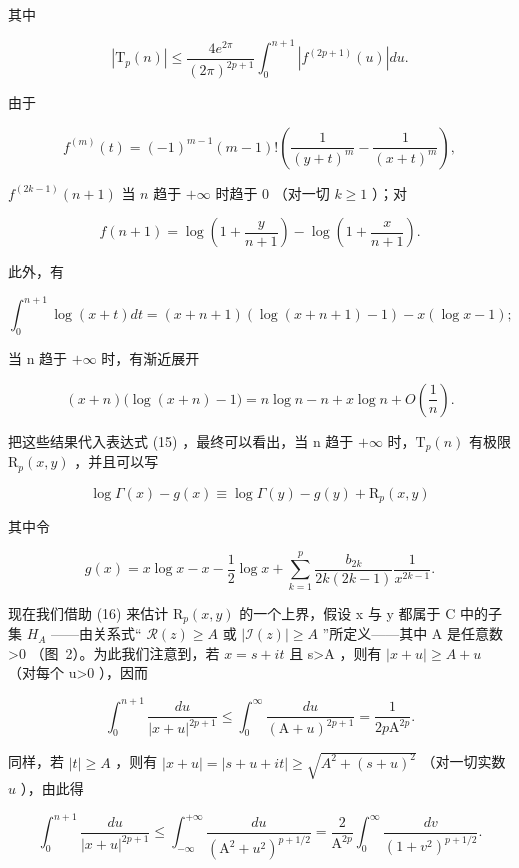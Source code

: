 其中

\[
\left| \mathrm{T} _ {p} (n) \right| \leqslant \frac {4 e ^ {2 \pi}}{(2 \pi) ^ {2 p + 1}} \int_ {0} ^ {n + 1} \left| f ^ {(2 p + 1)} (u) \right| d u.\tag{16}
\]

由于

\[
f ^ {(m)} (t) = (- 1) ^ {m - 1} (m - 1)! \left(\frac {1}{(y + t) ^ {m}} - \frac {1}{(x + t) ^ {m}}\right),
\]

\(f^{(2k - 1)}(n + 1)\) 当 \(n\) 趋于 \(+\infty\) 时趋于 0 （对一切 \(k \geqslant 1\) ）；对

\[
f (n + 1) = \log \left(1 + \frac {y}{n + 1}\right) - \log \left(1 + \frac {x}{n + 1}\right).
\]

此外，有

\[
\int_ {0} ^ {n + 1} \log (x + t) d t = (x + n + 1) (\log (x + n + 1) - 1) - x (\log x - 1);
\]

当 n 趋于 \(+\infty\) 时，有渐近展开

\[
(x + n) \bigl (\log (x + n) - 1 \bigr) = n \log n - n + x \log n + O \left(\frac {1}{n}\right).
\]

把这些结果代入表达式 (15) ，最终可以看出，当 n 趋于 \(+\infty\) 时，\(\mathrm{T}_{p}(n)\) 有极限 \(\mathrm{R}_{p}(x, y)\) ，并且可以写

\[
\log \Gamma (x) - g (x) \equiv \log \Gamma (y) - g (y) + \mathrm{R} _ {p} (x, y)\tag{mod.  \( 2\pi i \)}
\]

其中令

\[
g (x) = x \log x - x - \frac {1}{2} \log x + \sum_ {k = 1} ^ {p} \frac {b _ {2 k}}{2 k (2 k - 1)} \frac {1}{x ^ {2 k - 1}}.\tag{17}
\]

现在我们借助 (16) 来估计 \(\mathrm{R}_{p}(x,y)\) 的一个上界，假设 x 与 y 都属于 C 中的子集 \(H_{A}\) ——由关系式`` \(\mathcal{R}(z)\geqslant A\) 或 \(|\mathcal{I}(z)|\geqslant A\) ''所定义——其中 A 是任意数 \textgreater0 （图~2）。为此我们注意到，若 \(x=s+it\) 且 s\textgreater A ，则有 \(|x+u|\geqslant A+u\) （对每个 u\textgreater0 ），因而

\[
\int_ {0} ^ {n + 1} \frac {d u}{| x + u | ^ {2 p + 1}} \leqslant \int_ {0} ^ {\infty} \frac {d u}{(\mathrm{A} + u) ^ {2 p + 1}} = \frac {1}{2 p \mathrm{A} ^ {2 p}}.
\]

同样，若 \(|t| \geqslant A\) ，则有 \(|x + u| = |s + u + it| \geqslant \sqrt{A^2 + (s + u)^2}\) （对一切实数 \(u\) ），由此得

\[
\int_ {0} ^ {n + 1} \frac {d u}{| x + u | ^ {2 p + 1}} \leqslant \int_ {- \infty} ^ {+ \infty} \frac {d u}{(\mathrm{A} ^ {2} + u ^ {2}) ^ {p + 1 / 2}} = \frac {2}{\mathrm{A} ^ {2 p}} \int_ {0} ^ {\infty} \frac {d v}{(1 + v ^ {2}) ^ {p + 1 / 2}}.
\]

